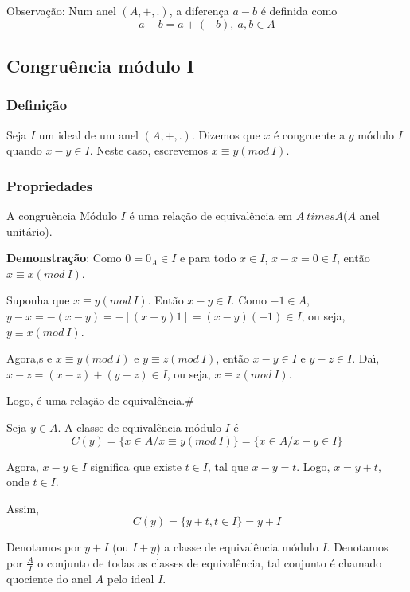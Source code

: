 Observa{\c c}{\~a}o: Num anel $(A,+,.)$, a diferen{\c c}a $a-b$ {\'e} definida como
\[a-b=a+(-b),\ a,b\in A\]

\subsection{Congru{\^e}ncia m{\'o}dulo I}
\subsubsection{Defini{\c c}{\~a}o}
\begin{definicao} Seja $I$ um ideal de um anel $(A,+,.)$. Dizemos que $x$ {\'e} congruente a $y$ m{\'o}dulo $I$ quando $x-y\in I$. Neste caso, escrevemos $x\equiv y(mod\ I)$.\end{definicao}

\subsubsection{Propriedades}
\begin{proposicao} A congru{\^e}ncia M{\'o}dulo $I$ {\'e} uma rela{\c c}{\~a}o de equival{\^e}ncia em $A \ times A$($A$ anel unit{\'a}rio).\end{proposicao}

\textbf{Demonstra{\c c}{\~a}o}: Como $0=0_{A}\in I$ e para todo $x\in I$, $x-x=0\in I$, ent{\~a}o $x\equiv x(mod\ I)$.

Suponha que $x\equiv y(mod\ I)$. Ent{\~a}o $x-y\in I$. Como $-1\in A$,$y-x=-(x-y)=-[(x-y)1]=(x-y)(-1)\in I$, ou seja, $y\equiv x(mod\ I)$.

Agora,s e $x\equiv y(mod\ I)$ e $y\equiv z(mod\ I)$, ent{\~a}o $x-y\in I$ e $y-z\in I$. Da{\'\i}, $x-z=(x-z)+(y-z)\in I$, ou seja, $x\equiv z(mod\ I)$.

Logo, {\'e} uma rela{\c c}{\~a}o de equival{\^e}ncia.\#

Seja $y\in A$. A classe de equival{\^e}ncia m{\'o}dulo $I$ {\'e}
\[C(y)=\{x\in A/x\equiv y(mod\ I)\}=\{x\in A/x-y\in I\}\]


Agora, $x-y\in I$ significa que existe $t\in I$, tal que $x-y=t$. Logo, $x=y+t$, onde $t\in I$.

Assim,
\[C(y)=\{y+t,t\in I\}=y+I\]

\begin{nota} Denotamos por $y+I$ (ou $I+y$) a classe de equival{\^e}ncia m{\'o}dulo $I$. Denotamos por $\displaystyle\frac{A}{I}$ o conjunto de todas as classes de equival{\^e}ncia, tal conjunto {\'e} chamado quociente do anel $A$ pelo ideal $I$.\end{nota}

